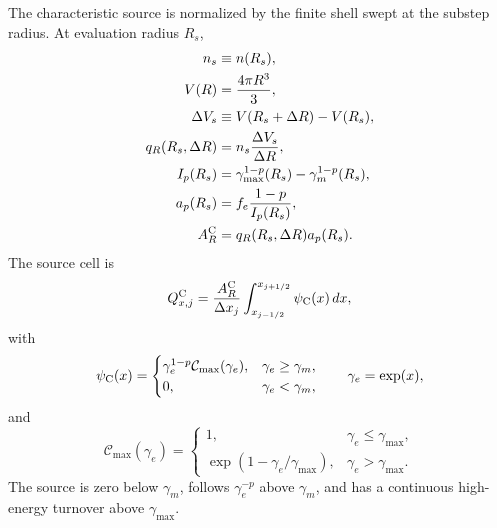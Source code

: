\documentclass[twocolumn]{aastex702}
\begin{document}
The characteristic source is normalized by the finite shell swept at the substep
radius.  At evaluation radius \(R_s\),
\begin{equation}
\begin{aligned}
n_s&\equiv n(R_s),\\
V(R)&=\frac{4\pi R^3}{3},\\
\Delta V_s&\equiv V(R_s+\Delta R)-V(R_s),\\
q_R(R_s,\Delta R)&=n_s\frac{\Delta V_s}{\Delta R},\\
I_p(R_s)&=\gamma_{\max}^{1-p}(R_s)-\gamma_m^{1-p}(R_s),\\
a_p(R_s)&=f_e\frac{1-p}{I_p(R_s)},\\
A_R^{\rm C}&=q_R(R_s,\Delta R)a_p(R_s).
\end{aligned}
\end{equation}
The source cell is
\begin{equation}
Q_{x,j}^{\rm C}=\frac{A_R^{\rm C}}{\Delta x_j}
\int_{x_{j-1/2}}^{x_{j+1/2}}
\psi_{\rm C}(x)\,dx ,
\end{equation}
with
\begin{equation}
\psi_{\rm C}(x)=
\begin{cases}
\gamma_e^{1-p}\mathcal C_{\max}(\gamma_e),
&\gamma_e\ge\gamma_m,\\
0,&\gamma_e<\gamma_m,
\end{cases}
\qquad \gamma_e=\exp(x),
\end{equation}
and
\begin{equation}
\mathcal C_{\max}(\gamma_e)=
\begin{cases}
1, & \gamma_e\le\gamma_{\max},\\
\exp(1-\gamma_e/\gamma_{\max}), & \gamma_e>\gamma_{\max}.
\end{cases}
\end{equation}
The source is zero below \(\gamma_m\), follows \(\gamma_e^{-p}\) above
\(\gamma_m\), and has a continuous high-energy turnover above \(\gamma_{\max}\).
\end{document}
